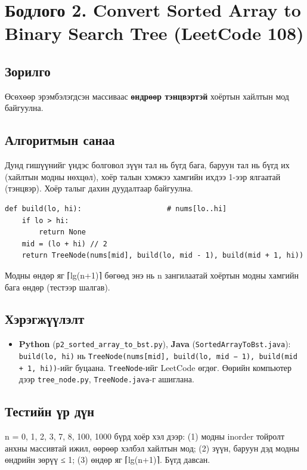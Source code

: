 \documentclass[11pt,a4paper]{article}
\begin{document}
\section{Бодлого 2. Convert Sorted Array to Binary Search Tree (LeetCode 108)}

\subsection{Зорилго}
Өсөхөөр эрэмбэлэгдсэн массиваас \textbf{өндрөөр тэнцвэртэй} хоёртын хайлтын мод байгуулна.

\subsection{Алгоритмын санаа}
Дунд гишүүнийг үндэс болговол зүүн тал нь бүгд бага, баруун тал нь бүгд их (хайлтын модны нөхцөл), хоёр талын хэмжээ хамгийн ихдээ 1-ээр ялгаатай (тэнцвэр). Хоёр талыг дахин дуудалтаар байгуулна.

\begin{Verbatim}
def build(lo, hi):                    # nums[lo..hi]
    if lo > hi:
        return None
    mid = (lo + hi) // 2
    return TreeNode(nums[mid], build(lo, mid - 1), build(mid + 1, hi))
\end{Verbatim}

Модны өндөр яг ⌈lg(n+1)⌉ бөгөөд энэ нь n зангилаатай хоёртын модны хамгийн бага өндөр (тестээр шалгав).

\subsection{Хэрэгжүүлэлт}
\begin{itemize}
\item \textbf{Python} (\texttt{p2\_\allowbreak{}sorted\_\allowbreak{}array\_\allowbreak{}to\_\allowbreak{}bst.\allowbreak{}py}), \textbf{Java} (\texttt{SortedArrayToBst.\allowbreak{}java}): \texttt{build(lo, hi)} нь \texttt{TreeNode(nums[mid], build(lo, mid − 1), build(mid + 1, hi))}-ийг буцаана. \texttt{TreeNode}-ийг LeetCode өгдөг. Өөрийн компьютер дээр \texttt{tree\_\allowbreak{}node.\allowbreak{}py}, \texttt{TreeNode.\allowbreak{}java}-г ашиглана.
\end{itemize}

\subsection{Тестийн үр дүн}
n = 0, 1, 2, 3, 7, 8, 100, 1000 бүрд хоёр хэл дээр: (1) модны inorder тойролт анхны массивтай ижил, өөрөөр хэлбэл хайлтын мод; (2) зүүн, баруун дэд модны өндрийн зөрүү ≤ 1; (3) өндөр яг ⌈lg(n+1)⌉. Бүгд давсан.
\end{document}
